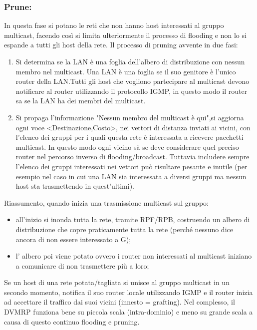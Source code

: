 \subsubsection{Prune:}
In questa fase si potano le reti che non hanno host interessati al gruppo multicast, facendo così si limita ulteriormente il processo di flooding e non lo si espande a tutti gli host della rete. Il processo di pruning avvente in due fasi:
\begin{enumerate}
  \item Si determina se la LAN è una foglia dell'albero di distribuzione con nessun membro nel multicast. Una LAN è una foglia se il suo genitore è l'unico router della LAN.Tutti gli host che vogliono partecipare al multicast devono notificare al router utilizzando il protocollo IGMP, in questo modo il router sa se la LAN ha dei membri del multicast.
  \item Si propaga l'informazione "Nessun membro del multicast è qui",si aggiorna ogni voce <Destinazione,Costo>, nei vettori di distanza inviati ai vicini, con l'elenco dei gruppi per i quali questa rete è interessata a ricevere pacchetti multicast. In questo modo ogni vicino sà se deve considerare quel preciso router nel percorso inverso di flooding/broadcast. Tuttavia includere sempre l'elenco dei gruppi interessati nei vettori può risultare pesante e inutile (per esempio nel caso in cui una LAN sia interessata a diversi gruppi ma nessun host sta trasmettendo in quest'ultimi).
\end{enumerate}
Riassumento, quando inizia una trasmissione multicast sul gruppo:
\begin{itemize}
  \item all’inizio si inonda tutta la rete, tramite RPF/RPB, costruendo un albero di distribuzione che copre praticamente tutta la rete (perché nessuno dice ancora di non essere interessato a G);
  \item l’ albero poi viene potato ovvero i router non interessati al multicast iniziano a comunicare di non trasmettere più a loro;
\end{itemize}
Se un host di una rete potata/tagliata si unisce al gruppo multicast in un secondo momento, notifica il suo router locale utilizzando IGMP e il router inizia ad accettare il traffico dai suoi vicini (innesto = grafting). Nel complesso, il DVMRP funziona bene su piccola scala (intra-dominio) e meno su grande scala a causa di questo continuo flooding e pruning.
